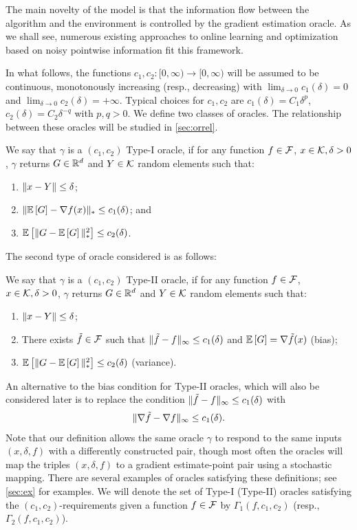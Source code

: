 The main novelty of the model is that the information flow between the algorithm and the environment is controlled by the gradient estimation oracle. As we shall see, numerous existing approaches to online learning and optimization based on noisy pointwise information fit this framework. 

In what follows, the functions $c_1,c_2:[0,\infty)\to [0,\infty)$ will be assumed to be continuous, 
monotonously increasing (resp., decreasing) with 
$\lim_{\delta\to  0} c_1(\delta)=0$ and $\lim_{\delta\to 0} c_2(\delta)=+\infty$.
Typical choices for $c_1,c_2$ are $c_1(\delta) = C_1 \delta^p$, $c_2(\delta) = C_2\delta^{-q}$ with $p,q>0$.
We define two classes of oracles. The relationship between these oracles will be studied in \cref{sec:orrel}.
\begin{definition}
We say that $\gamma$ is a  $(c_1,c_2)$ Type-I oracle, if for any function $f\in \mathcal{F}$,
$x\in \mathcal{K},\delta>0$, $\gamma$ returns $G\in \mathbb{R}^d$ and  $Y\in \mathcal{K}$ random elements such that:
\begin{enumerate}
\item $\|x-Y\|\le \delta$;
\item $\| \mathbb{E}\left[G\right]  - \nabla f(x)  \|_* \le c_1(\delta) $; and
\item $\mathbb{E}\left[\| G -  \mathbb{E}\left[G\right] \|_*^2\right] \le c_2(\delta)$.
\end{enumerate}
\end{definition}
The second type of oracle considered is as follows:
\begin{definition}
We say that $\gamma$ is a  $(c_1,c_2)$ Type-II oracle, if for any function $f\in \mathcal{F}$,
$x\in \mathcal{K},\delta>0$, $\gamma$ returns $G\in \mathbb{R}^d$ and  $Y\in \mathcal{K}$ random elements such that:
\begin{enumerate}
\item $\|x-Y\|\le \delta$;
\item There exists $\tilde{f} \in \mathcal{F}$ such that  
$\|\tilde{f}- f\|_\infty \le c_1(\delta)$  and
$\mathbb{E}\left[G\right]  = \nabla \tilde{f}(x)$ (bias);
\item $\mathbb{E}\left[\| G -  \mathbb{E}\left[G\right] \|_*^2\right] \le c_2(\delta)$ (variance).
\end{enumerate}
\end{definition}
An alternative to the bias condition for Type-II oracles, which will also be considered later is to replace the condition $\|\tilde{f}-f\|_\infty \le c_1(\delta)$ with
\begin{align}
\|\nabla \tilde{f}- \nabla f\|_\infty \le c_1(\delta).
\end{align}
Note that our definition allows the same oracle $\gamma$ to respond to the same inputs $(x,\delta,f)$ with a differently constructed pair, though most often the oracles will map the triples $(x,\delta,f)$ to a gradient estimate-point pair using a stochastic mapping.
There are several examples of oracles satisfying these definitions; see \cref{sec:ex} for examples.
We will denote the set of Type-I (Type-II) oracles satisfying the $(c_1,c_2)$-requirements given a function $f\in \mathcal{F}$ by $\Gamma_1(f,c_1,c_2)$ (resp., $\Gamma_2(f,c_1,c_2)$). 

